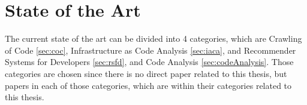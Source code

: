 \chapter{State of the Art}
\label{sec:stateofart}
The current state of the art can be divided into 4 categories, which are Crawling of Code \ref{sec:coc}, Infrastructure as Code Analysis \ref{sec:iaca}, and Recommender Systems for Developers \ref{sec:rsfd}, and Code Analysis \ref{sec:codeAnalysis}. Those categories are chosen since there is no direct paper related to this thesis, but papers in each of those categories, which are within their categories related to this thesis.


